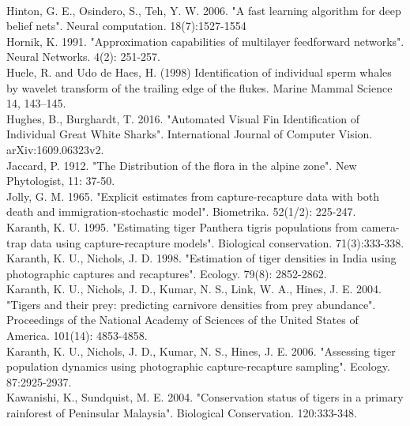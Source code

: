 \documentclass[11pt]{article}
\begin{document}
\\
Hinton, G. E., Osindero, S., Teh, Y. W. 2006. "A fast learning algorithm for deep belief nets". Neural computation. 18(7):1527-1554
\newline
\\
Hornik, K. 1991. "Approximation capabilities of multilayer feedforward networks". Neural Networks. 4(2): 251-257.
\newline
\\
Huele, R. and Udo de Haes, H. (1998) Identification of individual sperm whales by wavelet transform of the trailing edge of the flukes. Marine Mammal Science 14, 143–145.
\newline
\\
Hughes, B., Burghardt, T. 2016. "Automated Visual Fin Identification of Individual Great White Sharks". International Journal of Computer Vision. arXiv:1609.06323v2.
\newline
\\
Jaccard, P. 1912. "The Distribution of the flora in the alpine zone". New Phytologist, 11: 37-50. 
\newline
\\
Jolly, G. M. 1965. "Explicit estimates from capture-recapture data with both death and immigration-stochastic model". Biometrika. 52(1/2): 225-247.
\newline
\\
Karanth, K. U. 1995. "Estimating tiger Panthera tigris populations from camera-trap data using capture-recapture models". Biological conservation. 71(3):333-338.
\newline
\\
Karanth, K. U., Nichols, J. D. 1998. "Estimation of tiger densities in India using photographic captures and recaptures". Ecology. 79(8): 2852-2862.
\newline
\\
Karanth, K. U., Nichols, J. D., Kumar, N. S., Link, W. A., Hines, J. E. 2004. "Tigers and their prey: predicting carnivore densities from prey abundance". Proceedings of the National Academy of Sciences of the United States of America. 101(14): 4853-4858.
\newline
\\
Karanth, K. U., Nichols, J. D., Kumar, N. S., Hines, J. E. 2006. "Assessing tiger population dynamics using photographic capture-recapture sampling". Ecology. 87:2925-2937.
\newline
\\
Kawanishi, K., Sundquist, M. E. 2004. "Conservation status of tigers in a primary rainforest of Peninsular Malaysia". Biological Conservation. 120:333-348.
\end{document}
